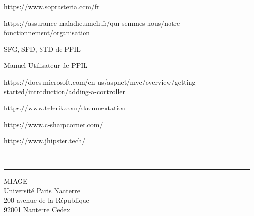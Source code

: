 \documentclass[a4paper,12pt]{book}
\makeatletter
\def\cleardoublepage{\clearpage\if@twoside \ifodd\c@page\else%
  \hbox{}%
  \thispagestyle{empty}%
  \newpage%
  \if@twocolumn\hbox{}\newpage\fi\fi\fi}
\theoremstyle{break}
\makeatother
\begin{document}

\mainmatter
\pagestyle{fancy}

\cleardoublepage







\appendix




https://www.soprasteria.com/fr

https://assurance-maladie.ameli.fr/qui-sommes-nous/notre-fonctionnement/organisation

SFG, SFD, STD de PPIL

Manuel Utilisateur de PPIL

https://docs.microsoft.com/en-us/aspnet/mvc/overview/getting-started/introduction/adding-a-controller

https://www.telerik.com/documentation

https://www.c-sharpcorner.com/

https://www.jhipster.tech/



%

\\
\noindent\rule[2pt]{\textwidth}{0.5pt}
\begin{center}
  MIAGE\\
  Université Paris Nanterre\\
  200 avenue de la République\\
  92001 Nanterre Cedex
\end{center}
\vspace*{\fill}
\end{document}
